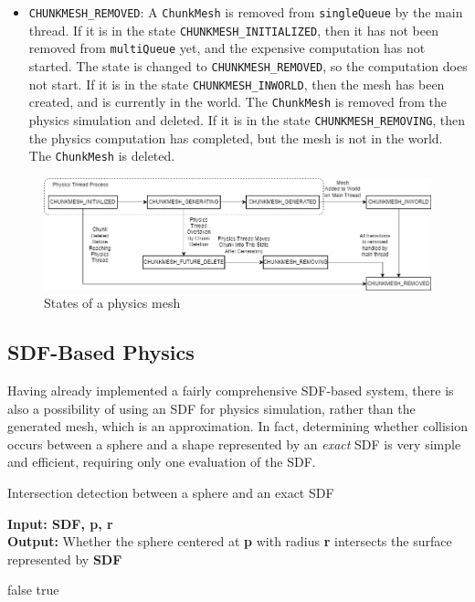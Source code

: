 \documentclass{article}
\begin{document}
\begin{itemize}
 \item \texttt{CHUNKMESH\_REMOVED}: A \texttt{ChunkMesh} is removed from \texttt{singleQueue} by the main thread. If it is in the state \texttt{CHUNKMESH\_INITIALIZED}, then it has not been removed from \texttt{multiQueue} yet, and the expensive computation has not started. The state is changed to \texttt{CHUNKMESH\_REMOVED}, so the computation does not start. If it is in the state \texttt{CHUNKMESH\_INWORLD}, then the mesh has been created, and is currently in the world. The \texttt{ChunkMesh} is removed from the physics simulation and deleted. If it is in the state \texttt{CHUNKMESH\_REMOVING}, then the physics computation has completed, but the mesh is not in the world. The \texttt{ChunkMesh} is deleted.
\end{itemize}

 \begin{figure}[H]
  \includegraphics[width=\textwidth]{physics_states.png}
  \caption{States of a physics mesh}
  \label{fig:physics_states}
\end{figure}

\subsection{SDF-Based Physics}
Having already implemented a fairly comprehensive SDF-based system, there is also a possibility of using an SDF for physics simulation, rather than the generated mesh, which is an approximation. In fact, determining whether collision occurs between a sphere and a shape represented by an \textit{exact} SDF is very simple and efficient, requiring only one evaluation of the SDF.

\begin{algorithm}[H]
  \caption{Intersection detection between a sphere and an exact SDF}\label{alg:sdf_sphere_collision}
  \hspace*{\algorithmicindent} \textbf{Input: SDF, p, r} \\
  \hspace*{\algorithmicindent} \textbf{Output:} Whether the sphere centered at \textbf{p} with radius \textbf{r} intersects the surface represented by \textbf{SDF} 
  \begin{algorithmic}
   \State\Return false
  \Else \State \Return true
  \EndIf
  \end{algorithmic}
\end{algorithm}
\end{document}
